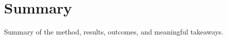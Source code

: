\section{\label{sec:summary}Summary}
Summary of the method, results, outcomes, and meaningful takeaways.
